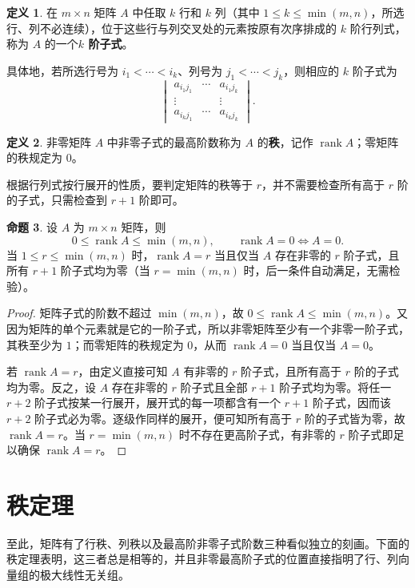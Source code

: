 \documentclass[UTF8, fontset=fandol, a4paper, 12pt]{ctexart}
\newcommand{\rank}{\operatorname{rank}}
\theoremstyle{definition}
\newtheorem{definition}{定义}[section]
\newtheorem{proposition}[definition]{命题}
\begin{document}
\begin{definition}
在 $m\times n$ 矩阵 $A$ 中任取 $k$ 行和 $k$ 列（其中 $1\le k\le\min(m,n)$，所选行、列不必连续），位于这些行与列交叉处的元素按原有次序排成的 $k$ 阶行列式，称为 $A$ 的一个\textbf{$k$ 阶子式}。
\end{definition}

具体地，若所选行号为 $i_1<\cdots<i_k$、列号为 $j_1<\cdots<j_k$，则相应的 $k$ 阶子式为
\[
 \begin{vmatrix}
 a_{i_1j_1}&\cdots&a_{i_1j_k}\\
 \vdots&&\vdots\\
 a_{i_kj_1}&\cdots&a_{i_kj_k}
 \end{vmatrix}.
\]

\begin{definition}
非零矩阵 $A$ 中非零子式的最高阶数称为 $A$ 的\textbf{秩}，记作 $\rank A$；零矩阵的秩规定为 $0$。
\end{definition}

根据行列式按行展开的性质，要判定矩阵的秩等于 $r$，并不需要检查所有高于 $r$ 阶的子式，只需检查到 $r+1$ 阶即可。

\begin{proposition}
设 $A$ 为 $m\times n$ 矩阵，则
\[
 0\le\rank A\le\min(m,n),\qquad
 \rank A=0\Longleftrightarrow A=0.
\]
当 $1\le r\le\min(m,n)$ 时，$\rank A=r$ 当且仅当 $A$ 存在非零的 $r$ 阶子式，且所有 $r+1$ 阶子式均为零（当 $r=\min(m,n)$ 时，后一条件自动满足，无需检验）。
\end{proposition}
\begin{proof}
矩阵子式的阶数不超过 $\min(m,n)$，故 $0\le\rank A\le\min(m,n)$。又因为矩阵的单个元素就是它的一阶子式，所以非零矩阵至少有一个非零一阶子式，其秩至少为 $1$；而零矩阵的秩规定为 $0$，从而 $\rank A=0$ 当且仅当 $A=0$。

若 $\rank A=r$，由定义直接可知 $A$ 有非零的 $r$ 阶子式，且所有高于 $r$ 阶的子式均为零。反之，设 $A$ 存在非零的 $r$ 阶子式且全部 $r+1$ 阶子式均为零。将任一 $r+2$ 阶子式按某一行展开，展开式的每一项都含有一个 $r+1$ 阶子式，因而该 $r+2$ 阶子式必为零。逐级作同样的展开，便可知所有高于 $r$ 阶的子式皆为零，故 $\rank A=r$。当 $r=\min(m,n)$ 时不存在更高阶子式，有非零的 $r$ 阶子式即足以确保 $\rank A=r$。
\end{proof}

\section{秩定理}

至此，矩阵有了行秩、列秩以及最高阶非零子式阶数三种看似独立的刻画。下面的秩定理表明，这三者总是相等的，并且非零最高阶子式的位置直接指明了行、列向量组的极大线性无关组。
\end{document}

